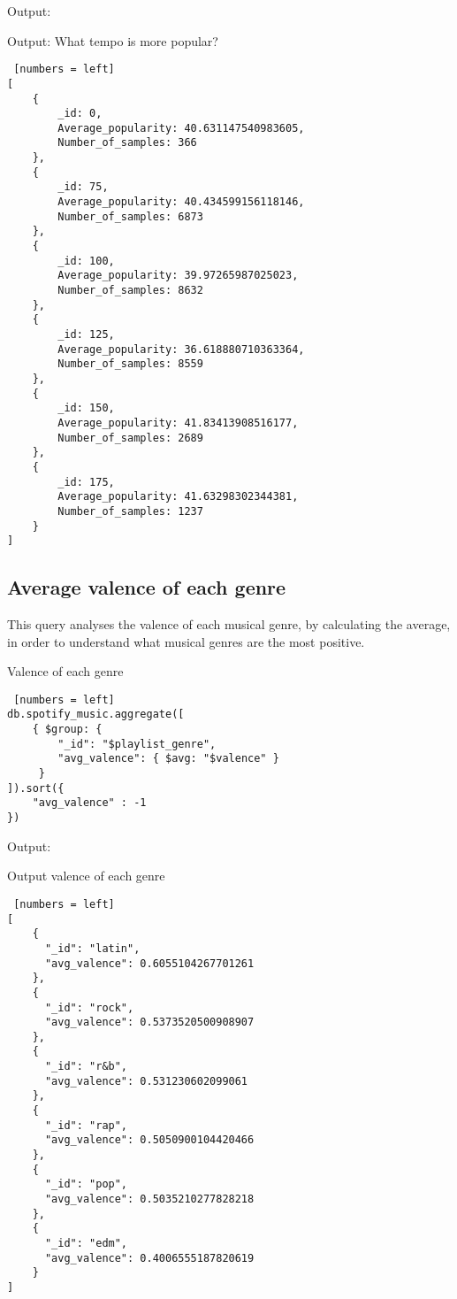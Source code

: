Output:
\begin{algorithm}[ht]
\caption{Output: What tempo is more popular?}
\begin{lstlisting} [numbers = left]
[
	{
		_id: 0,
		Average_popularity: 40.631147540983605,
		Number_of_samples: 366
	},
	{
		_id: 75,
		Average_popularity: 40.434599156118146,
		Number_of_samples: 6873
	},
	{
		_id: 100,
		Average_popularity: 39.97265987025023,
		Number_of_samples: 8632
	},
	{
		_id: 125,
		Average_popularity: 36.618880710363364,
		Number_of_samples: 8559
	},
	{
		_id: 150,
		Average_popularity: 41.83413908516177,
		Number_of_samples: 2689
	},
	{
		_id: 175,
		Average_popularity: 41.63298302344381,
		Number_of_samples: 1237
	}
]
\end{lstlisting}
\end{algorithm}

\newpage

\subsection{Average valence of each genre}
This query analyses the valence of each musical genre, by calculating the average, in order to understand what musical genres are the most positive.\\

\begin{algorithm}[ht]
\caption{Valence of each genre}
\begin{lstlisting} [numbers = left]
db.spotify_music.aggregate([
	{ $group: {
        "_id": "$playlist_genre",
        "avg_valence": { $avg: "$valence" }
     } 
]).sort({
	"avg_valence" : -1
})
\end{lstlisting}
\end{algorithm}
\newpage

Output:
\begin{algorithm}[h!]
\caption{Output valence of each genre}
\begin{lstlisting} [numbers = left]
[
	{
      "_id": "latin",
      "avg_valence": 0.6055104267701261
    },
	{
      "_id": "rock",
      "avg_valence": 0.5373520500908907
    },
	{
      "_id": "r&b",
      "avg_valence": 0.531230602099061
    },
	{
      "_id": "rap",
      "avg_valence": 0.5050900104420466
    },
	{
      "_id": "pop",
      "avg_valence": 0.5035210277828218
    },
	{
      "_id": "edm",
      "avg_valence": 0.4006555187820619
    }
]
\end{lstlisting}
\end{algorithm}
\newpage


